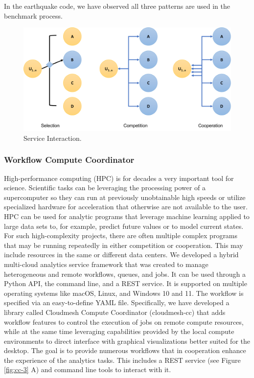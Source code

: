 \documentclass[utf8]{FrontiersinVancouver} %
\begin{document}
In the earthquake code, we have observed all three patterns are used
in the benchmark process.

\begin{figure}[htb]
\centering\includegraphics[width=0.75\columnwidth]{images/processes-nist.pdf}
\caption{Service Interaction.}
\label{fig:service-interaction}
\end{figure}




\subsubsection{Workflow Compute Coordinator}
\label{sec:workflow-cc}


High-performance computing (HPC) is for decades a very important tool
for science. Scientific tasks can be leveraging the processing power
of a supercomputer so they can run at previously unobtainable high
speeds or utilize specialized hardware for acceleration that otherwise
are not available to the user. HPC can be used for analytic programs
that leverage machine learning applied to large data sets to, for
example, predict future values or to model current states. For such
high-complexity projects, there are often multiple complex programs
that may be running repeatedly in either competition or cooperation.
This may include resources in the same or different data centers. We
developed a hybrid multi-cloud analytics service framework that was
created to manage heterogeneous and remote workflows, queues, and
jobs.  It can be used through a Python API, the command line, and a
REST service. It is supported on multiple operating systems like
macOS, Linux, and Windows 10 and 11.  The workflow is specified via an
easy-to-define YAML file.  Specifically, we have developed a library
called Cloudmesh Compute Coordinator (cloudmesh-cc)
\citep{las-22-arxiv-workflow-cc} that adds workflow features to
control the execution of jobs on remote compute resources, while at
the same time leveraging capabilities provided by the local compute
environments to direct interface with graphical visualizations better
suited for the desktop. The goal is to provide numerous workflows that
in cooperation enhance the experience of the analytics tasks. This
includes a REST service (see Figure \ref{fig:cc-3} A) and command line
tools to interact with it.
\end{document}
